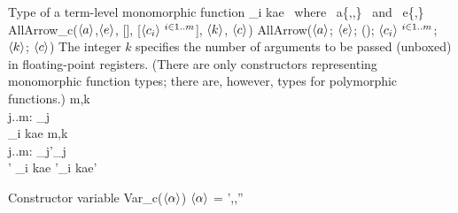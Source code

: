 \documentclass[12pt,twoside,fleqn]{article}
\begin{document}
  {Type of a term-level monomorphic function}
  {\allarrowmil{}
          {\constructor_i}
          {k}{a}{e}{\constructor} \mbox{\ where\ }
       a\in\{,,\} \mbox{\ and\ }
       e\in\{,\}}
  {AllArrow\_c($\langle{a}\rangle$,$\langle{e}\rangle$,%
               [],%
               [$\langle{c_i}\rangle\ {}^{i\in 1..m}$], $\langle{k}\rangle$,%
               $\langle{c}\rangle$)}
  {AllArrow($\langle{a}\rangle$; $\langle{e}\rangle$;
               ();
               $\langle{c_i}\rangle\ {}^{i\in 1..m}$; 
               $\langle{k}\rangle$;
               $\langle{c}\rangle$)}
  {The integer $k$ specifies the number of arguments to be passed (unboxed)
   in floating-point registers.  (There are only constructors representing
   monomorphic function types; there are, however, types for polymorphic
   functions.)}
  {\irule
    {m,k\\
     \forall j..m:\quad
       \validconstructor{\context}
          {\constructor_j}{\ktype}\\
     \validconstructor{\context}
          {\constructor}{\ktype}}
    {\validconstructor{\context}
       {\allarrowmil{}
          {\constructor_i}
          {k}{a}{e}{\constructor}}
       {\ktype}}
   \irule
    {m,k\\
     \forall j..m:\quad
       \equivconstructor{\context}
          {\constructor_j}{\constructor'_j}{\ktype}\\
     \equivconstructor{\context}
          {\constructor}{\constructor'}{\ktype}}
    {\equivconstructor{\context}
       {\allarrowmil{}
          {\constructor_i}
          {k}{a}{e}{\constructor}}
       {\allarrowmil{}
          {\constructor'_i}
          {k}{a}{e}{\constructor'}}
       {\ktype}}
  }

  {Constructor variable}
  {\cvar}
  {Var\_c($\langle{\alpha}\rangle$)}
  {$\langle{\alpha}\rangle$}
  {}
  {\irule
    {\validcontext{\context}\qquad
     \context = \context',\cvar{:}\kind,\context''}
    {\validconstructor{\context}{\cvar}{\kind}}}
\end{document}
